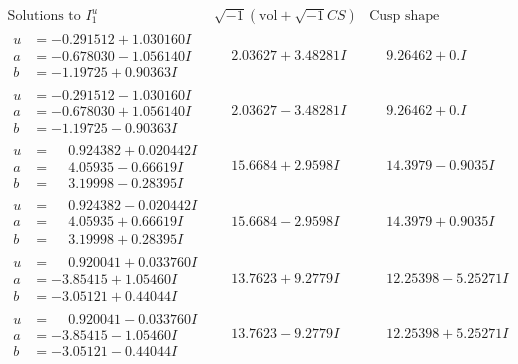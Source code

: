 \documentclass[1p]{elsarticle_modified}
\theoremstyle{definition}
\newcommand{\I}{\sqrt{-1}}
\begin{document}
$$\begin{array}{c|c|c}  
\text{Solutions to }I^u_{1}& \I (\text{vol} + \sqrt{-1}CS) & \text{Cusp shape}\\
 \hline 
\begin{aligned}
u &= -0.291512 + 1.030160 I \\
a &= -0.678030 - 1.056140 I \\
b &= -1.19725 + 0.90363 I\end{aligned}
 & \phantom{-}2.03627 + 3.48281 I & \phantom{-}9.26462 + 0. I\phantom{ +0.000000I} \\ \hline\begin{aligned}
u &= -0.291512 - 1.030160 I \\
a &= -0.678030 + 1.056140 I \\
b &= -1.19725 - 0.90363 I\end{aligned}
 & \phantom{-}2.03627 - 3.48281 I & \phantom{-}9.26462 + 0. I\phantom{ +0.000000I} \\ \hline\begin{aligned}
u &= \phantom{-}0.924382 + 0.020442 I \\
a &= \phantom{-}4.05935 - 0.66619 I \\
b &= \phantom{-}3.19998 - 0.28395 I\end{aligned}
 & \phantom{-}15.6684 + 2.9598 I & \phantom{-}14.3979 - 0.9035 I \\ \hline\begin{aligned}
u &= \phantom{-}0.924382 - 0.020442 I \\
a &= \phantom{-}4.05935 + 0.66619 I \\
b &= \phantom{-}3.19998 + 0.28395 I\end{aligned}
 & \phantom{-}15.6684 - 2.9598 I & \phantom{-}14.3979 + 0.9035 I \\ \hline\begin{aligned}
u &= \phantom{-}0.920041 + 0.033760 I \\
a &= -3.85415 + 1.05460 I \\
b &= -3.05121 + 0.44044 I\end{aligned}
 & \phantom{-}13.7623 + 9.2779 I & \phantom{-}12.25398 - 5.25271 I \\ \hline\begin{aligned}
u &= \phantom{-}0.920041 - 0.033760 I \\
a &= -3.85415 - 1.05460 I \\
b &= -3.05121 - 0.44044 I\end{aligned}
 & \phantom{-}13.7623 - 9.2779 I & \phantom{-}12.25398 + 5.25271 I \\ \hline\begin{aligned}

\end{aligned}
\end{array}$$
\end{document}
